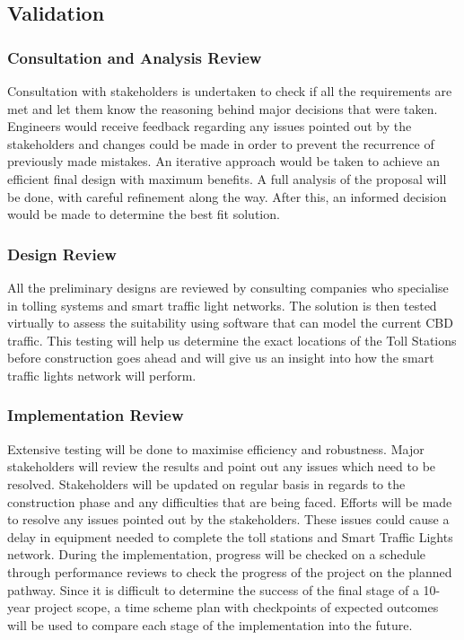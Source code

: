 \documentclass[twoside, a4paper, 11pt]{article}
\begin{document}
\subsection{Validation}
\subsubsection{Consultation and Analysis Review}
Consultation with stakeholders is undertaken to check if all the requirements are met and let them know the reasoning behind major decisions that were taken. Engineers would receive feedback regarding any issues pointed out by the stakeholders and changes could be made in order to prevent the recurrence of previously made mistakes. An iterative approach would be taken to achieve an efficient final design with maximum benefits. A full analysis of the proposal will be done, with careful refinement along the way. After this, an informed decision would be made to determine the best fit solution.
\subsubsection{Design Review}
All the preliminary designs are reviewed by consulting companies who specialise in tolling systems and smart traffic light networks. The solution is then tested virtually to assess the suitability using software that can model the current CBD traffic. This testing will help us determine the exact locations of the Toll Stations before construction goes ahead and will give us an insight into how the smart traffic lights network will perform.
\subsubsection{Implementation Review}
Extensive testing will be done to maximise efficiency and robustness. Major stakeholders will review the results and point out any issues which need to be resolved. Stakeholders will be updated on regular basis in regards to the construction phase and any difficulties that are being faced. Efforts will be made to resolve any issues pointed out by the stakeholders. These issues could cause a delay in equipment needed to complete the toll stations and Smart Traffic Lights network. 
During the implementation, progress will be checked on a schedule through performance reviews to check the progress of the project on the planned pathway. Since it is difficult to determine the success of the final stage of a 10-year project scope, a time scheme plan with checkpoints of expected outcomes will be used to compare each stage of the implementation into the future.
\end{document}
